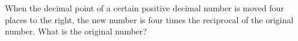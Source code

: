 When the decimal point of a certain positive decimal number is moved four places to the right, the new number is four times the reciprocal of the original number. What is the original number?

